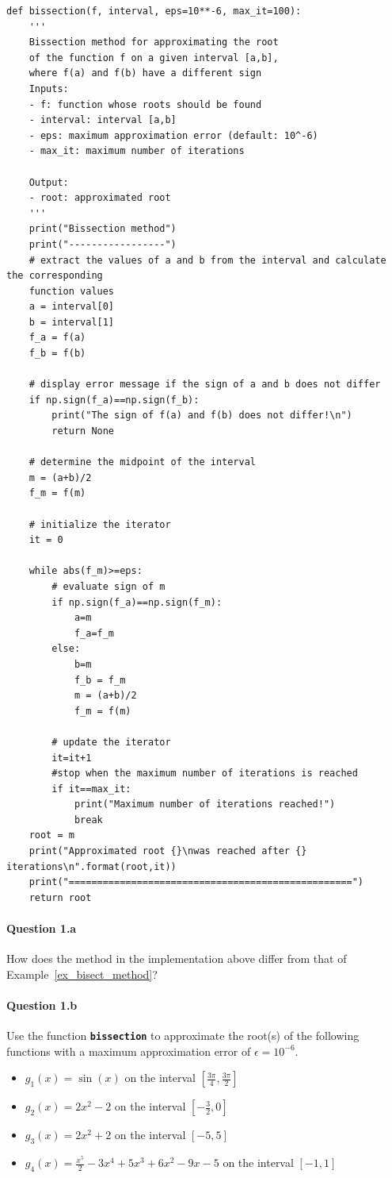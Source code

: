 \begin{lstlisting}
def bissection(f, interval, eps=10**-6, max_it=100):
	'''
	Bissection method for approximating the root
	of the function f on a given interval [a,b], 
	where f(a) and f(b) have a different sign
	Inputs: 
	- f: function whose roots should be found
	- interval: interval [a,b]
	- eps: maximum approximation error (default: 10^-6)
	- max_it: maximum number of iterations
	
	Output:
	- root: approximated root
	'''
	print("Bissection method")
	print("-----------------")
	# extract the values of a and b from the interval and calculate the corresponding
    function values
	a = interval[0]
	b = interval[1]
	f_a = f(a)
	f_b = f(b)
	
	# display error message if the sign of a and b does not differ
	if np.sign(f_a)==np.sign(f_b):
		print("The sign of f(a) and f(b) does not differ!\n")
		return None
	
	# determine the midpoint of the interval
	m = (a+b)/2
	f_m = f(m)
	
	# initialize the iterator
	it = 0
	
	while abs(f_m)>=eps:
		# evaluate sign of m
		if np.sign(f_a)==np.sign(f_m):
			a=m
			f_a=f_m
		else:
			b=m
			f_b = f_m
			m = (a+b)/2
			f_m = f(m)
		
		# update the iterator
		it=it+1
		#stop when the maximum number of iterations is reached
		if it==max_it:
			print("Maximum number of iterations reached!")
			break
	root = m
	print("Approximated root {}\nwas reached after {} iterations\n".format(root,it))
	print("==================================================")
	return root
\end{lstlisting}


\paragraph{Question 1.a}
How does the method in the implementation above differ from that of Example~\ref{ex_bisect_method}?

\paragraph{Question 1.b}
Use the function \textbf{\lstinline|bissection|} to approximate the root(s) of the following functions with a maximum approximation error of $\epsilon = 10^{-6}$.
\begin{itemize}
	\item $g_1(x) = \sin(x)$ on the interval $\left[\frac{3\pi}{4},\frac{3\pi}{2}\right]$
	\item $g_2(x) = 2x^2-2$ on the interval $\left[-\frac{3}{2},0\right]$
	\item $g_3(x) = 2x^2+2$ on the interval $\left[-5,5\right]$
	\item $g_4(x) = \frac{x^5}{2}-3x^4 + 5 x^3 + 6 x^2 - 9 x - 5$ on the interval $\left[-1,1\right]$
\end{itemize}


